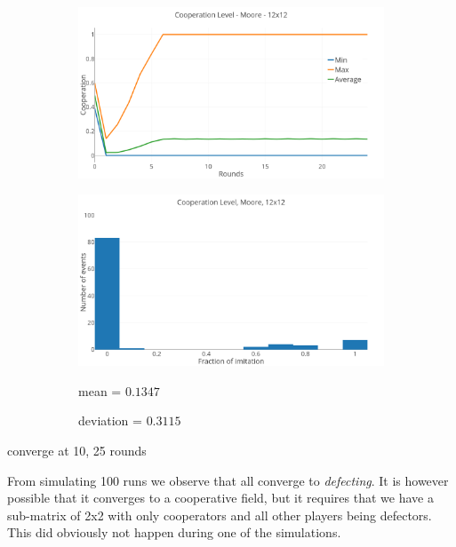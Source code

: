 \documentclass[a4paper, 11pt]{article}
\begin{document}
\begin{figure}[H]
\begin{subfigure}{.75\textwidth}
	\includegraphics[width=1\linewidth]{PDMoore12x12}
\end{subfigure}

\begin{subfigure}{.75\textwidth}
	\includegraphics[width=1\linewidth]{PDMoore12x12HG}
\end{subfigure}%
\begin{subfigure}{.25\textwidth}
	mean = $0.1347$
	
	deviation = $0.3115$
\end{subfigure}

\end{figure}

converge at 10, 25 rounds

	From simulating 100 runs we observe that all converge to \textit{defecting}. It is however possible that it converges to a cooperative field, but it requires that we have a sub-matrix of 2x2 with only cooperators and all other players being defectors. This did obviously not happen during one of the simulations.
\end{document}
